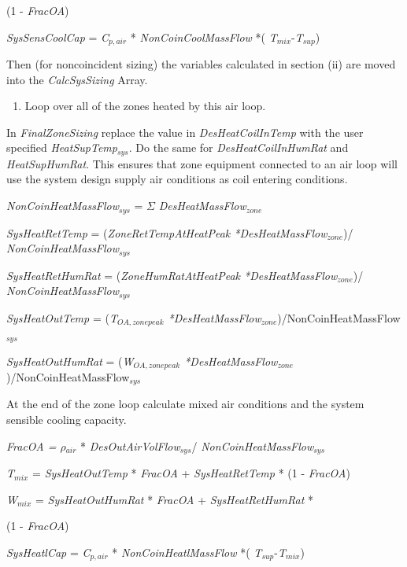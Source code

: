 (1 - \emph{FracOA})

\emph{SysSensCoolCap} = \emph{C\(_{p,air}\)} * \emph{NonCoinCoolMassFlow} *( \emph{T\(_{mix}\)}-\emph{T\(_{sup}\)})

Then (for noncoincident sizing) the variables calculated in section (ii) are moved into the \emph{CalcSysSizing} Array.

\begin{enumerate}
\def\labelenumi{(\alph{enumi})}
\setcounter{enumi}{2}
\item Loop over all of the zones heated by this air loop.
\end{enumerate}

In \emph{FinalZoneSizing} replace the value in \emph{DesHeatCoilInTemp} with the user specified \emph{HeatSupTemp\(_{sys}\)}. Do the same for \emph{DesHeatCoilInHumRat} and \emph{HeatSupHumRat}. This ensures that zone equipment connected to an air loop will use the system design supply air conditions as coil entering conditions.

\emph{NonCoinHeatMassFlow\(_{sys}\)} = $\Sigma$ \emph{DesHeatMassFlow\(_{zone}\)}

\emph{SysHeatRetTemp} = (\emph{ZoneRetTempAtHeatPeak *}\emph{DesHeatMassFlow\(_{zone}\)})/
\emph{NonCoinHeatMassFlow\(_{sys}\)}

\emph{SysHeatRetHumRat} = (\emph{ZoneHumRatAtHeatPeak *}\emph{DesHeatMassFlow\(_{zone}\)})/
\emph{NonCoinHeatMassFlow\(_{sys}\)}

\emph{SysHeatOutTemp} = (\emph{T\(_{OA,zone peak}\) *DesHeatMassFlow\(_{zone}\)})/NonCoinHeatMassFlow\(_{sys}\)

\emph{SysHeatOutHumRat} = (\emph{W\(_{OA,zone peak}\) *DesHeatMassFlow\(_{zone}\)})/NonCoinHeatMassFlow\(_{sys}\)

At the end of the zone loop calculate mixed air conditions and the system sensible cooling capacity.

\emph{FracOA = $\rho$\(_{air}\)} * \emph{DesOutAirVolFlow\(_{sys}\)}/ \emph{NonCoinHeatMassFlow\(_{sys}\)}

\emph{T\(_{mix}\)} = \emph{SysHeatOutTemp} * \emph{FracOA} + \emph{SysHeatRetTemp} * (1 - \emph{FracOA})

\emph{W\(_{mix}\)} = \emph{SysHeatOutHumRat} * \emph{FracOA} + \emph{SysHeatRetHumRat} *

(1 - \emph{FracOA})

\emph{SysHeatlCap} = \emph{C\(_{p,air}\)} * \emph{NonCoinHeatlMassFlow} *( \emph{T\(_{sup}\)}-\emph{T\(_{mix}\)})

